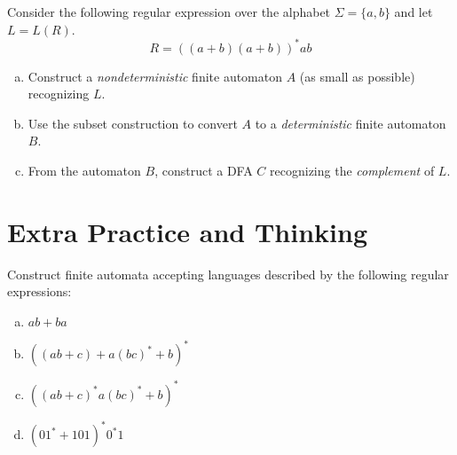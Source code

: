 \documentclass[a4paper,12pt]{amsart}
\begin{document}
\medskip\begin{problem}
    
    Consider the following regular expression over the alphabet $\Sigma=\{a,b\}$ and let $L=L(R)$.
    \[
        R=((a + b)(a + b))^*ab
    \]
    \begin{enumerate}[(a)]
        \item Construct a \emph{nondeterministic} finite automaton $A$ (as small as possible) recognizing $L$.
        \item Use the subset construction to convert $A$ to a \emph{deterministic} finite automaton $B$.
        \item From the automaton $B$, construct a DFA $C$ recognizing the \emph{complement} of $L$.
    \end{enumerate}

\end{problem}

\medskip

\section*{Extra Practice and Thinking}


\begin{problem}

    Construct finite automata accepting languages described by the following regular expressions:
    
    \vspace{-10pt}

    \begin{multicols}{2}
    
        \begin{enumerate}[(a)]\setlength\itemsep{0pt}
            \item $ab + ba$
            \item $((ab + c)+a(bc)^* + b)^*$
            \item $((ab + c)^*a(bc)^* + b)^*$
            \item $(01^* + 101)^*0^*1$
        \end{enumerate}
    
    \end{multicols}
    
\end{problem}
\end{document}
